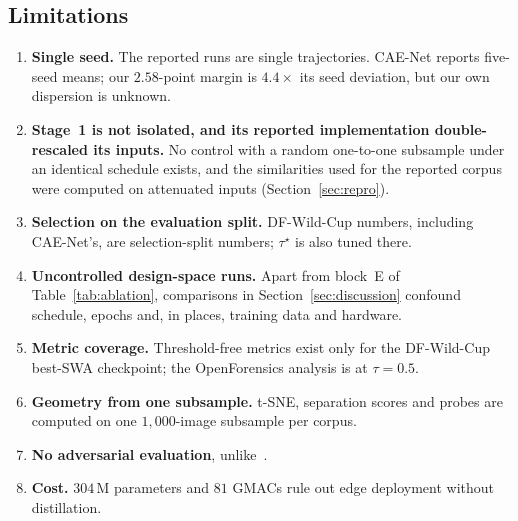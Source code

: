 \documentclass[10pt,journal]{IEEEtran}
\begin{document}
\subsection{Limitations}\label{sec:limits}
\begin{enumerate}
\item \textbf{Single seed.} The reported runs are single trajectories. CAE-Net
reports five-seed means; our $2.58$-point margin is $4.4\times$ its seed
deviation, but our own dispersion is unknown.
\item \textbf{Stage~1 is not isolated, and its reported implementation
double-rescaled its inputs.} No control with a random one-to-one subsample
under an identical schedule exists, and the similarities used for the reported
corpus were computed on attenuated inputs (Section~\ref{sec:repro}).
\item \textbf{Selection on the evaluation split.} DF-Wild-Cup numbers,
including CAE-Net's, are selection-split numbers; $\tau^\star$ is also tuned
there.
\item \textbf{Uncontrolled design-space runs.} Apart from block~E of
Table~\ref{tab:ablation}, comparisons in Section~\ref{sec:discussion} confound
schedule, epochs and, in places, training data and hardware.
\item \textbf{Metric coverage.} Threshold-free metrics exist only for the
DF-Wild-Cup best-SWA checkpoint; the OpenForensics analysis is at
$\tau=0.5$.
\item \textbf{Geometry from one subsample.} t-SNE, separation scores and
probes are computed on one $1{,}000$-image subsample per corpus.
\item \textbf{No adversarial evaluation}, unlike~\cite{bhattacharjee2026caenet}.
\item \textbf{Cost.} $304$\,M parameters and $81$ GMACs rule out edge
deployment without distillation.
\end{enumerate}

\end{document}
